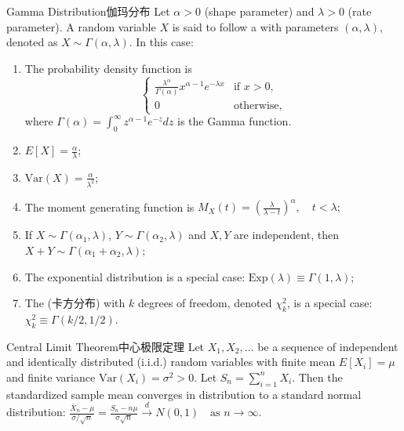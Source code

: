\documentclass[../main.tex]{subfiles}
\begin{document}
\begin{proposition}{Gamma Distribution}{伽玛分布}
Let $\alpha > 0$ (shape parameter) and $\lambda > 0$ (rate parameter). A random variable $X$ is said to follow a  with parameters $(\alpha, \lambda)$, denoted as $X \sim \Gamma(\alpha, \lambda)$. In this case:
\begin{enumerate}
\item The probability density function is
$$\begin{cases} 
\frac{\lambda^\alpha}{\Gamma(\alpha)} x^{\alpha-1} e^{-\lambda x} & \text{if } x > 0, \\
0 & \text{otherwise},
\end{cases}$$
where $\Gamma(\alpha) = \int_0^\infty z^{\alpha-1}e^{-z}dz$ is the Gamma function.
\item $E[X] = \frac{\alpha}{\lambda}$;
\item $\text{Var}(X) = \frac{\alpha}{\lambda^2}$;
\item The moment generating function is
$M_X(t) = \left(\frac{\lambda}{\lambda-t}\right)^\alpha, \quad t < \lambda;$
\item If $X \sim \Gamma(\alpha_1, \lambda)$, $Y \sim \Gamma(\alpha_2, \lambda)$ and $X,Y$ are independent, then
$X+Y \sim \Gamma(\alpha_1+\alpha_2, \lambda);$
\item The exponential distribution is a special case: $\text{Exp}(\lambda) \equiv \Gamma(1, \lambda)$;
\item The  (卡方分布) with $k$ degrees of freedom, denoted $\chi^2_k$, is a special case: $\chi^2_k \equiv \Gamma(k/2, 1/2)$.
\end{enumerate}
\end{proposition}
\begin{proposition}{Central Limit Theorem}{中心极限定理}
Let $X_1, X_2, \ldots$ be a sequence of independent and identically distributed (i.i.d.) random variables with finite mean $E[X_i] = \mu$ and finite variance $\text{Var}(X_i) = \sigma^2 > 0$. Let $S_n = \sum_{i=1}^n X_i$. Then the standardized sample mean converges in distribution to a standard normal distribution:
$\frac{\bar{X}_n - \mu}{\sigma/\sqrt{n}} = \frac{S_n - n\mu}{\sigma\sqrt{n}} \xrightarrow{d} N(0,1) \quad \text{as } n \to \infty.$
\end{proposition}
\end{document}
